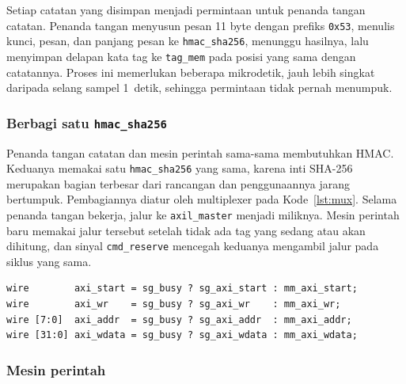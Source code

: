 \documentclass[11pt,a4paper]{article}
\begin{document}
Setiap catatan yang disimpan menjadi permintaan untuk penanda tangan catatan. Penanda tangan
menyusun pesan 11 byte dengan prefiks \texttt{0x53}, menulis kunci, pesan, dan panjang pesan ke
\texttt{hmac\_sha256}, menunggu hasilnya, lalu menyimpan delapan kata tag ke \texttt{tag\_mem}
pada posisi yang sama dengan catatannya. Proses ini memerlukan beberapa mikrodetik, jauh lebih
singkat daripada selang sampel 1~detik, sehingga permintaan tidak pernah menumpuk.

\subsubsection*{Berbagi satu \texttt{hmac\_sha256}}

Penanda tangan catatan dan mesin perintah sama-sama membutuhkan HMAC. Keduanya memakai satu
\texttt{hmac\_sha256} yang sama, karena inti SHA-256 merupakan bagian terbesar dari rancangan dan
penggunaannya jarang bertumpuk. Pembagiannya diatur oleh multiplexer pada Kode~\ref{lst:mux}.
Selama penanda tangan bekerja, jalur ke \texttt{axil\_master} menjadi miliknya. Mesin perintah
baru memakai jalur tersebut setelah tidak ada tag yang sedang atau akan dihitung, dan sinyal
\texttt{cmd\_reserve} mencegah keduanya mengambil jalur pada siklus yang sama.

\noindent\begin{minipage}{\linewidth}
\begin{lstlisting}[caption={Multiplexer jalur HMAC di \texttt{auth\_ctrl.v} (baris 433--436).},
  label={lst:mux}]
wire        axi_start = sg_busy ? sg_axi_start : mm_axi_start;
wire        axi_wr    = sg_busy ? sg_axi_wr    : mm_axi_wr;
wire [7:0]  axi_addr  = sg_busy ? sg_axi_addr  : mm_axi_addr;
wire [31:0] axi_wdata = sg_busy ? sg_axi_wdata : mm_axi_wdata;
\end{lstlisting}
\end{minipage}

\subsubsection*{Mesin perintah}
\end{document}
